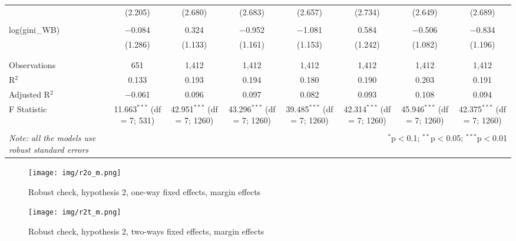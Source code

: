 \documentclass[a4paper, 12pt]{article}
\begin{document}
\begin{table}[!htbp]
{\begin{tabular}{@{\extracolsep{5pt}}lccccccc}
  & (2.205) & (2.680) & (2.683) & (2.657) & (2.734) & (2.649) & (2.689) \\ 
  & & & & & & & \\ 
 log(gini\_WB) & $-$0.084 & 0.324 & $-$0.952 & $-$1.081 & 0.584 & $-$0.506 & $-$0.834 \\ 
  & (1.286) & (1.133) & (1.161) & (1.153) & (1.242) & (1.082) & (1.196) \\ 
  & & & & & & & \\ 
\hline \\[-1.8ex] 
Observations & 651 & 1,412 & 1,412 & 1,412 & 1,412 & 1,412 & 1,412 \\ 
R$^{2}$ & 0.133 & 0.193 & 0.194 & 0.180 & 0.190 & 0.203 & 0.191 \\ 
Adjusted R$^{2}$ & $-$0.061 & 0.096 & 0.097 & 0.082 & 0.093 & 0.108 & 0.094 \\ 
F Statistic & 11.663$^{***}$ (df = 7; 531) & 42.951$^{***}$ (df = 7; 1260) & 43.296$^{***}$ (df = 7; 1260) & 39.485$^{***}$ (df = 7; 1260) & 42.314$^{***}$ (df = 7; 1260) & 45.946$^{***}$ (df = 7; 1260) & 42.375$^{***}$ (df = 7; 1260) \\ 
\hline 
\hline \\[-1.8ex] 
\textit{Note: all the models use robust standard errors}  & \multicolumn{7}{r}{$^{*}$p$<$0.1; $^{**}$p$<$0.05; $^{***}$p$<$0.01} \\ 
\end{tabular} 
}
\end{table} 



\begin{figure}[h!]
    \centering
    \texttt{[image: img/r2o\_m.png]}
    \caption{Robust check, hypothesis 2, one-way fixed effects, margin effects}
    \label{r2o_m}
\end{figure}

\begin{figure}[h!]
    \centering
    \texttt{[image: img/r2t\_m.png]}
    \caption{Robust check, hypothesis 2, two-ways fixed effects, margin effects}
    \label{r2t_m}
\end{figure}
\end{document}
